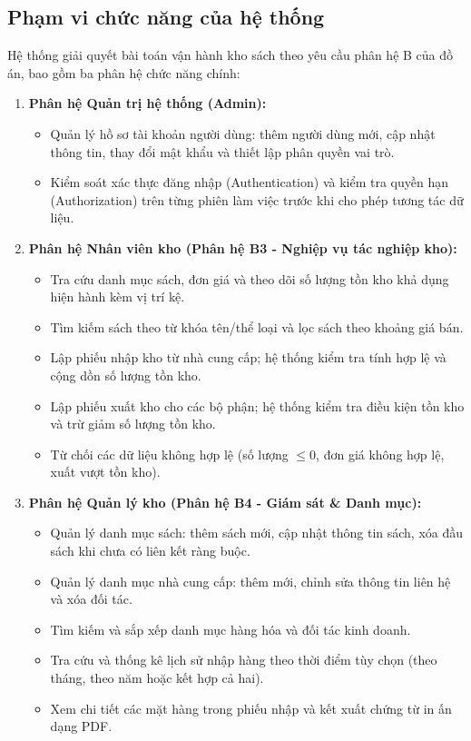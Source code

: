 \documentclass[12pt,a4paper]{article}
\begin{document}
\subsection{Phạm vi chức năng của hệ thống}
\label{subsec:pham-vi}

Hệ thống giải quyết bài toán vận hành kho sách theo yêu cầu phân hệ B của đồ án, bao gồm ba phân hệ chức năng chính:
\begin{enumerate}
    \item \textbf{Phân hệ Quản trị hệ thống (Admin):}
    \begin{itemize}
        \item Quản lý hồ sơ tài khoản người dùng: thêm người dùng mới, cập nhật thông tin, thay đổi mật khẩu và thiết lập phân quyền vai trò.
        \item Kiểm soát xác thực đăng nhập (Authentication) và kiểm tra quyền hạn (Authorization) trên từng phiên làm việc trước khi cho phép tương tác dữ liệu.
    \end{itemize}
    \item \textbf{Phân hệ Nhân viên kho (Phân hệ B3 - Nghiệp vụ tác nghiệp kho):}
    \begin{itemize}
        \item Tra cứu danh mục sách, đơn giá và theo dõi số lượng tồn kho khả dụng hiện hành kèm vị trí kệ.
        \item Tìm kiếm sách theo từ khóa tên/thể loại và lọc sách theo khoảng giá bán.
        \item Lập phiếu nhập kho từ nhà cung cấp; hệ thống kiểm tra tính hợp lệ và cộng dồn số lượng tồn kho.
        \item Lập phiếu xuất kho cho các bộ phận; hệ thống kiểm tra điều kiện tồn kho và trừ giảm số lượng tồn kho.
        \item Từ chối các dữ liệu không hợp lệ (số lượng $\le 0$, đơn giá không hợp lệ, xuất vượt tồn kho).
    \end{itemize}
    \item \textbf{Phân hệ Quản lý kho (Phân hệ B4 - Giám sát \& Danh mục):}
    \begin{itemize}
        \item Quản lý danh mục sách: thêm sách mới, cập nhật thông tin sách, xóa đầu sách khi chưa có liên kết ràng buộc.
        \item Quản lý danh mục nhà cung cấp: thêm mới, chỉnh sửa thông tin liên hệ và xóa đối tác.
        \item Tìm kiếm và sắp xếp danh mục hàng hóa và đối tác kinh doanh.
        \item Tra cứu và thống kê lịch sử nhập hàng theo thời điểm tùy chọn (theo tháng, theo năm hoặc kết hợp cả hai).
        \item Xem chi tiết các mặt hàng trong phiếu nhập và kết xuất chứng từ in ấn dạng PDF.
    \end{itemize}
\end{enumerate}
\end{document}
